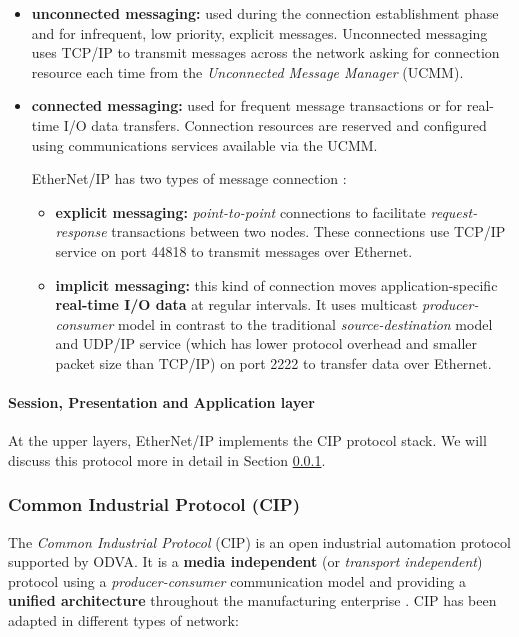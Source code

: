 \begin{itemize}
	\item \textbf{unconnected messaging:} used during the connection establishment phase and for infrequent, low priority, explicit messages. Unconnected messaging uses TCP/IP to transmit messages across the network asking for connection resource each time from the \textit{Unconnected Message Manager} (UCMM).
	
	\item \textbf{connected messaging:} used for frequent message transactions or for real-time I/O data transfers. Connection resources are reserved and configured using communications services available via the UCMM.
	
	\bigskip
	EtherNet/IP has two types of message connection \cite{enip_pdf}:
	\begin{itemize}
		\item \textbf{explicit messaging:} \textit{point-to-point} connections to facilitate \textit{request-response} transactions between two nodes. These connections use TCP/IP service on port 44818 to transmit messages over Ethernet.
		
		\item \textbf{implicit messaging:} this kind of connection moves application-specific \textbf{real-time I/O data} at regular intervals. It uses multicast \textit{producer-consumer} model in contrast to the traditional \textit{source-destination} model and UDP/IP service (which has lower protocol overhead and smaller packet size than TCP/IP) on port 2222 to transfer data over Ethernet. 
	\end{itemize}
\end{itemize}

\paragraph{Session, Presentation and Application layer} At the upper layers, EtherNet/IP implements the CIP protocol stack. We will discuss this protocol more in detail in Section \ref{subsubsec:cip}. 

\subsubsection{Common Industrial Protocol (CIP)}
\label{subsubsec:cip}
The \textit{Common Industrial Protocol} (CIP) is an open industrial automation protocol supported by ODVA. It is a \textbf{media independent} (or \textit{transport independent}) protocol using a \textit{producer-consumer} communication model and providing a \textbf{unified architecture} throughout the manufacturing enterprise \cite{cip_protocol_web}\cite{cip_wiki}.\newline
CIP has been adapted in different types of network:

